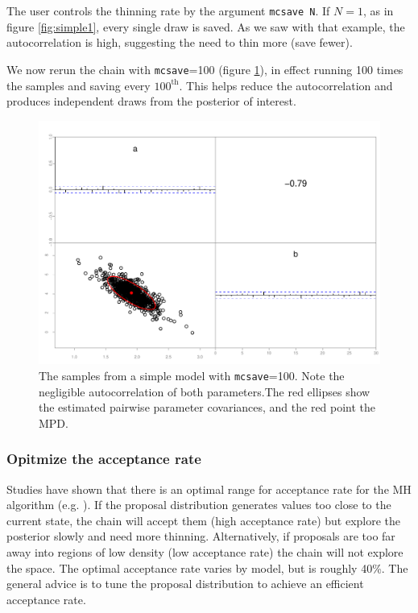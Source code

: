 \documentclass{article}\usepackage[]{graphicx}\usepackage[]{color}
\begin{document}
The user controls the thinning rate by the argument
\texttt{mcsave N}. If $N=1$, as in figure \ref{fig:simple1},
every single draw is saved. As we saw with that example, the
autocorrelation is high, suggesting the need to thin more
(save fewer).

We now rerun the chain with \texttt{mcsave}=100 (figure
\ref{fig:simple2}), in effect running 100 times the samples
and saving every $100^{\text{th}}$. This helps reduce the
autocorrelation and produces independent draws from the
posterior of interest.
\begin{figure}[h]
  \centering
  \includegraphics[width=5in]{../plots/simple2.pdf}
  \caption{The samples from a simple model with
    \texttt{mcsave}=100. Note the negligible autocorrelation
    of both parameters.The red ellipses show the estimated
    pairwise parameter covariances, and the red point the
    MPD.}
  \label{fig:simple2}
\end{figure}

\subsubsection{Opitmize the acceptance rate}
Studies have shown that there is an optimal range for
acceptance rate for the MH algorithm
(e.g. \cite{roberts2001}). If the proposal distribution
generates values too close to the current state, the chain
will accept them (high acceptance rate) but explore the
posterior slowly and need more thinning. Alternatively, if
proposals are too far away into regions of low density (low
acceptance rate) the chain will not explore the space. The
optimal acceptance rate varies by model, but is roughly
40\%. The general advice is to tune the proposal
distribution to achieve an efficient acceptance rate.
\end{document}
